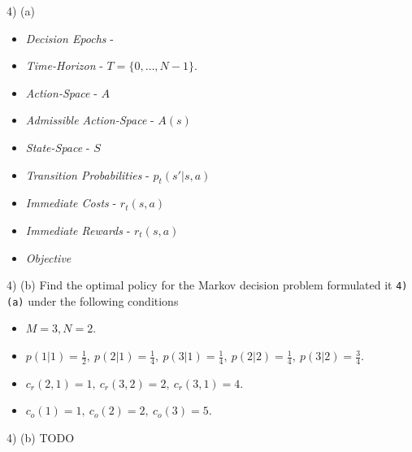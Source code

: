 \documentclass[11pt,a4paper]{article}
\begin{document}
\begin{answer}{4) (a)}
  \begin{itemize}
    \item \textit{Decision Epochs} -
    \item \textit{Time-Horizon} - $T=\{0,\dots,N-1\}$.
    \item \textit{Action-Space} - $A$
    \item \textit{Admissible Action-Space} - $A(s)$
    \item \textit{State-Space} - $S$
    \item \textit{Transition Probabilities} - $p_t(s'|s,a)$
    \item \textit{Immediate Costs} - $r_t(s,a)$
    \item \textit{Immediate Rewards} - $r_t(s,a)$
    \item \textit{Objective}
  \end{itemize}
\end{answer}

\begin{question}{4) (b)}
  Find the optimal policy for the Markov decision problem formulated it \texttt{4) (a)} under the following conditions
  \begin{itemize}
    \item $M=3,N=2$.
    \item $p(1|1)=\frac12,\ p(2|1)=\frac14,\ p(3|1)=\frac14,\ p(2|2)=\frac14,\ p(3|2)=\frac34$.
    \item $c_r(2,1)=1,\ c_r(3,2)=2,\ c_r(3,1)=4$.
    \item $c_o(1)=1,\ c_o(2)=2,\ c_o(3)=5$.
  \end{itemize}
\end{question}

\begin{answer}{4) (b)}
  TODO
\end{answer}
\end{document}
